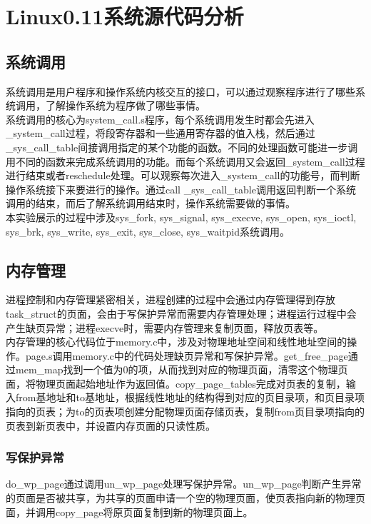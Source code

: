 \documentclass[]{report}
\begin{document}
\chapter{Linux0.11系统源代码分析}


\section{系统调用}
系统调用是用户程序和操作系统内核交互的接口，可以通过观察程序进行了哪些系统调用，了解操作系统为程序做了哪些事情。\\

系统调用的核心为system\_call.s程序，每个系统调用发生时都会先进入\_system\_call过程，将段寄存器和一些通用寄存器的值入栈，然后通过\_sys\_call\_table间接调用指定的某个功能的函数。不同的处理函数可能进一步调用不同的函数来完成系统调用的功能。而每个系统调用又会返回\_system\_call过程进行结束或者reschedule处理。可以观察每次进入\_system\_call的功能号，而判断操作系统接下来要进行的操作。通过call \_sys\_call\_table调用返回判断一个系统调用的结束，而后了解系统调用结束时，操作系统需要做的事情。\\

本实验展示的过程中涉及sys\_fork, sys\_signal, sys\_execve, sys\_open, sys\_ioctl, sys\_brk, sys\_write, sys\_exit, sys\_close, sys\_waitpid系统调用。

\section{内存管理}
进程控制和内存管理紧密相关，进程创建的过程中会通过内存管理得到存放task\_struct的页面，会由于写保护异常而需要内存管理处理；进程运行过程中会产生缺页异常；进程execve时，需要内存管理来复制页面，释放页表等。\\

内存管理的核心代码位于memory.c中，涉及对物理地址空间和线性地址空间的操作。page.s调用memory.c中的代码处理缺页异常和写保护异常。get\_free\_page通过mem\_map找到一个值为0的项，从而找到对应的物理页面，清零这个物理页面，将物理页面起始地址作为返回值。copy\_page\_tables完成对页表的复制，输入from基地址和to基地址，根据线性地址的结构得到对应的页目录项，和页目录项指向的页表；为to的页表项创建分配物理页面存储页表，复制from页目录项指向的页表到新页表中，并设置内存页面的只读性质。\\
\subsection{写保护异常}
do\_wp\_page通过调用un\_wp\_page处理写保护异常。un\_wp\_page判断产生异常的页面是否被共享，为共享的页面申请一个空的物理页面，使页表指向新的物理页面，并调用copy\_page将原页面复制到新的物理页面上。\\
\end{document}

